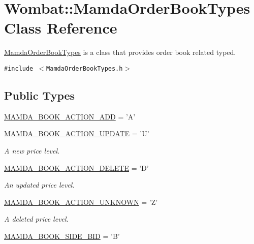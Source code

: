 \hypertarget{classWombat_1_1MamdaOrderBookTypes}{
\section{Wombat::Mamda\-Order\-Book\-Types Class Reference}
\label{classWombat_1_1MamdaOrderBookTypes}
}
\hyperlink{classWombat_1_1MamdaOrderBookTypes}{Mamda\-Order\-Book\-Types} is a class that provides order book related typed.  


{\tt \#include $<$Mamda\-Order\-Book\-Types.h$>$}

\subsection*{Public Types}
\begin{CompactItemize}
\item 
\hyperlink{classWombat_1_1MamdaOrderBookTypes_674fcb8aae6f411d51060acc45b6c11eea055995d49fd15e831c1e4fe2f4679e}{MAMDA\_\-BOOK\_\-ACTION\_\-ADD} = 'A'
\item 
\hyperlink{classWombat_1_1MamdaOrderBookTypes_674fcb8aae6f411d51060acc45b6c11ecbd438722f7ccf88ebbe7e670fff1089}{MAMDA\_\-BOOK\_\-ACTION\_\-UPDATE} = 'U'
\begin{CompactList}\small\item\em A new price level. \item\end{CompactList}\item 
\hyperlink{classWombat_1_1MamdaOrderBookTypes_674fcb8aae6f411d51060acc45b6c11e4e17dea22867ea0daf0a6a3747c7240f}{MAMDA\_\-BOOK\_\-ACTION\_\-DELETE} = 'D'
\begin{CompactList}\small\item\em An updated price level. \item\end{CompactList}\item 
\hyperlink{classWombat_1_1MamdaOrderBookTypes_674fcb8aae6f411d51060acc45b6c11e768e0d111850adb548026aee2c659d75}{MAMDA\_\-BOOK\_\-ACTION\_\-UNKNOWN} = 'Z'
\begin{CompactList}\small\item\em A deleted price level. \item\end{CompactList}\item 
\hyperlink{classWombat_1_1MamdaOrderBookTypes_87019addc1047d47d704b155101393437db44a272d8806d33943b7e6fad90ac2}{MAMDA\_\-BOOK\_\-SIDE\_\-BID} = 'B'
\item 

\end{CompactItemize}
